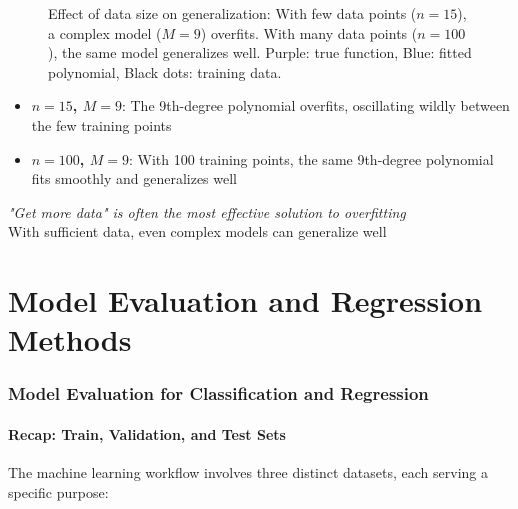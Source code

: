\documentclass[11pt,a4paper]{article}
\theoremstyle{definition}
\theoremstyle{plain}
\theoremstyle{remark}
\begin{document}
\begin{figure}[h]
\begin{tikzpicture}
\end{tikzpicture}
\caption{Effect of data size on generalization: With few data points ($n=15$), a complex model ($M=9$) overfits. With many data points ($n=100$), the same model generalizes well. Purple: true function, Blue: fitted polynomial, Black dots: training data.}
\end{figure}

\begin{itemize}
    \item \textbf{$n = 15$, $M = 9$}: The 9th-degree polynomial overfits, oscillating wildly between the few training points
    \item \textbf{$n = 100$, $M = 9$}: With 100 training points, the same 9th-degree polynomial fits smoothly and generalizes well
\end{itemize}

\begin{center}
\colorbox{blue!10}{\parbox{0.9\textwidth}{
\centering
\textit{"Get more data" is often the most effective solution to overfitting}\\[0.1cm]
With sufficient data, even complex models can generalize well
}}
\end{center}



\newpage

\part{Model Evaluation and Regression Methods}

\section{Model Evaluation for Classification and Regression}

\subsection{Recap: Train, Validation, and Test Sets}

The machine learning workflow involves three distinct datasets, each serving a specific purpose:
\end{document}
